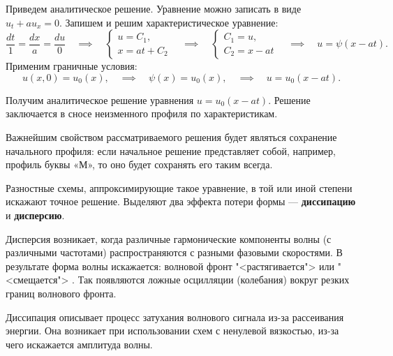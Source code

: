 \documentclass[12pt, a4paper]{article}
\begin{document}
Приведем аналитическое решение. Уравнение можно записать в виде $ u_t + a u_x = 0 $.
Запишем и решим характеристическое уравнение:
\begin{equation*}
	\dfrac{dt}{1} = \dfrac{dx}{a} = \dfrac{du}{0} \quad \implies  \quad 
	\begin{cases}
		u = C_1,\\
		x = a t + C_2
	\end{cases} 
	\quad \implies \quad
	\begin{cases}
		C_1 = u,\\
		C_2 = x - at
	\end{cases}
	\quad \implies \quad
	u = \psi(x-a t).
\end{equation*}
\newpage
Применим граничные условия:
\vspace{-1em}
\begin{equation*}
	u(x, 0) = u_0(x),
	\quad \implies \quad
	\psi(x) = u_0(x),
	\quad \implies \quad
	u = u_0(x-a t).
\end{equation*}

Получим аналитическое решение уравнения $u = u_0(x-at)$. Решение заключается в сносе неизменного профиля по характеристикам. 

Важнейшим свойством рассматриваемого решения будет являться сохранение начального профиля: если начальное решение представляет собой, например, профиль буквы «М», то оно будет сохранять его таким всегда. 

Разностные схемы, аппроксимирующие такое уравнение, в той или иной степени искажают точное решение. Выделяют два эффекта потери формы --- \textbf{диссипацию} и \textbf{дисперсию}.

Дисперсия возникает, когда различные гармонические компоненты волны (с различными частотами) распространяются с разными фазовыми скоростями. В результате форма волны искажается: волновой фронт "<растягивается"> или "<смещается"> . Так появляются ложные осцилляции (колебания) вокруг резких границ волнового фронта. \cite[c.283]{1}

Диссипация описывает процесс затухания волнового сигнала из-за рассеивания энергии. Она возникает при использовании схем с ненулевой вязкостью, из-за чего искажается амплитуда волны.  
\end{document}
